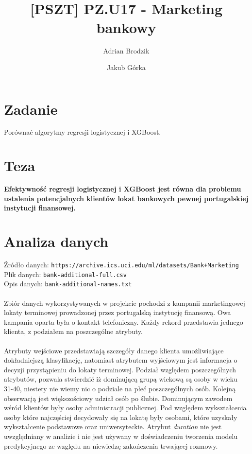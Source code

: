 \documentclass[12pt,a4paper]{article}
\begin{document}
\title{[PSZT] PZ.U17 - Marketing bankowy}
\author{Adrian Brodzik \and Jakub Górka}
\maketitle

\section*{Zadanie}
Porównać algorytmy regresji logistycznej i XGBoost.

\section*{Teza}
\textbf{Efektywność regresji logistycznej i XGBoost jest równa dla problemu ustalenia potencjalnych klientów lokat bankowych pewnej portugalskiej instytucji finansowej.}

\section*{Analiza danych}
Źródło danych: \texttt{https://archive.ics.uci.edu/ml/datasets/Bank+Marketing}
\\
Plik danych: \texttt{bank-additional-full.csv}
\\
Opis danych: \texttt{bank-additional-names.txt}
\\
\\
Zbiór danych wykorzystywanych w projekcie pochodzi z kampanii marketingowej lokaty terminowej
prowadzonej przez portugalską instytucję finansową. Owa kampania oparta była o kontakt
telefoniczny. Każdy rekord przedstawia jednego klienta, z podziałem na poszczególne atrybuty.
\\
\\
Atrybuty wejściowe przedstawiają szczegóły danego klienta umożliwiające dokładniejszą klasyfikację,
natomiast atrybutem wyjściowym jest informacja o decyzji przystąpieniu do lokaty terminowej.
Podział względem poszczególnych atrybutów, pozwala stwierdzić iż dominującą grupą wiekową są
osoby w wieku 31-40, niestety nie wiemy nic o podziale na płeć poszczególnych osób. Kolejną
obserwacją jest większościowy udział osób po ślubie. Dominującym zawodem wśród klientów były
osoby administracji publicznej. Pod względem wykształcenia osoby które najczęściej decydowały się
na lokatę były osobami, które uzyskały wykształcenie podstawowe oraz uniwersyteckie. Atrybut
\textit{duration} nie jest uwzględniany w analizie i nie jest używany w doświadczeniu tworzenia modelu
predykcyjnego ze względu na niewiedzę zakończenia trwającej rozmowy.
\end{document}
